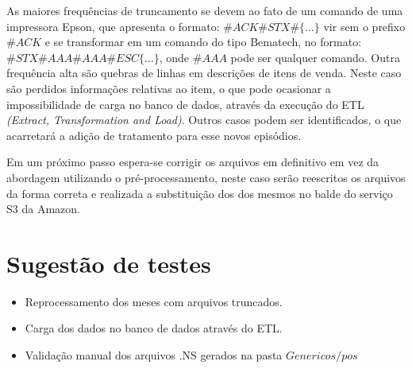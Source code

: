 \documentclass{article}      %
\begin{document}
As maiores frequências de truncamento se devem ao fato de um comando de uma impressora Epson, que apresenta o formato: $\#ACK\#STX\#\{...\}$ vir sem o prefixo $\#ACK$ e se transformar em um comando do tipo Bematech, no formato: $\#STX\#AAA\#AAA\#ESC\{...\}$, onde $\#AAA$ pode ser qualquer comando. Outra frequência alta são quebras de linhas em descrições de itens de venda. Neste caso são perdidos informações relativas ao item, o que pode ocasionar a impossibilidade de carga no banco de dados, através da execução do ETL \emph{(Extract, Transformation and Load)}. Outros casos podem ser identificados, o que acarretará a adição de tratamento para esse novos episódios.  

Em um próximo passo espera-se corrigir os arquivos em definitivo em vez da abordagem utilizando o pré-processamento, neste caso serão reescritos os arquivos da forma correta e realizada a substituição dos dos mesmos no balde do serviço S3 da Amazon. 

\section{Sugestão de testes}

\begin{itemize}
    \item Reprocessamento dos meses com arquivos truncados.  
    \item Carga dos dados no banco de dados através do ETL.
    \item Validação manual dos arquivos .NS gerados na pasta $Genericos/pos$
\end{itemize}



\end{document}
